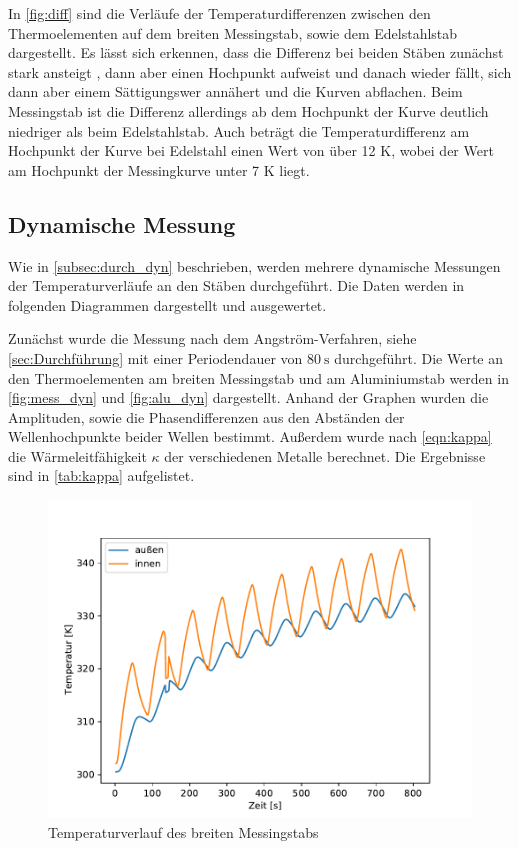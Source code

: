 In \autoref{fig:diff} sind die Verläufe der Temperaturdifferenzen zwischen den Thermoelementen auf dem breiten Messingstab, sowie dem Edelstahlstab dargestellt.
Es lässt sich erkennen, dass die Differenz bei beiden Stäben zunächst stark ansteigt , dann aber einen Hochpunkt aufweist und danach wieder fällt,
sich dann aber einem Sättigungswer annähert und die Kurven abflachen. 
Beim Messingstab ist die Differenz allerdings ab dem Hochpunkt der Kurve deutlich niedriger als beim Edelstahlstab.
Auch beträgt die Temperaturdifferenz am Hochpunkt der Kurve bei Edelstahl einen Wert von über 12 K, wobei der Wert am Hochpunkt der Messingkurve unter 7 K liegt.

\subsection{Dynamische Messung}
\label{aus_dyn}

Wie in \autoref{subsec:durch_dyn} beschrieben, werden mehrere dynamische Messungen der Temperaturverläufe an den Stäben durchgeführt. 
Die Daten werden in folgenden Diagrammen dargestellt und ausgewertet.

Zunächst wurde die Messung nach dem Angström-Verfahren, siehe \autoref{sec:Durchführung} mit einer Periodendauer von $\qty{80}{\second}$ durchgeführt.
Die Werte an den Thermoelementen am breiten Messingstab und am Aluminiumstab werden in \autoref{fig:mess_dyn} und \autoref{fig:alu_dyn} dargestellt.
Anhand der Graphen wurden die Amplituden, sowie die Phasendifferenzen aus den Abständen der Wellenhochpunkte beider Wellen bestimmt.
Außerdem wurde nach \autoref{eqn:kappa} die Wärmeleitfähigkeit $\kappa$ der verschiedenen Metalle berechnet. Die Ergebnisse sind in \autoref{tab:kappa} aufgelistet.
\begin{figure}[!htbp]
  \centering
  \includegraphics{content/dyn_80_mess.pdf}
  \caption{Temperaturverlauf des breiten Messingstabs}
  \label{fig:mess_dyn}
\end{figure}

